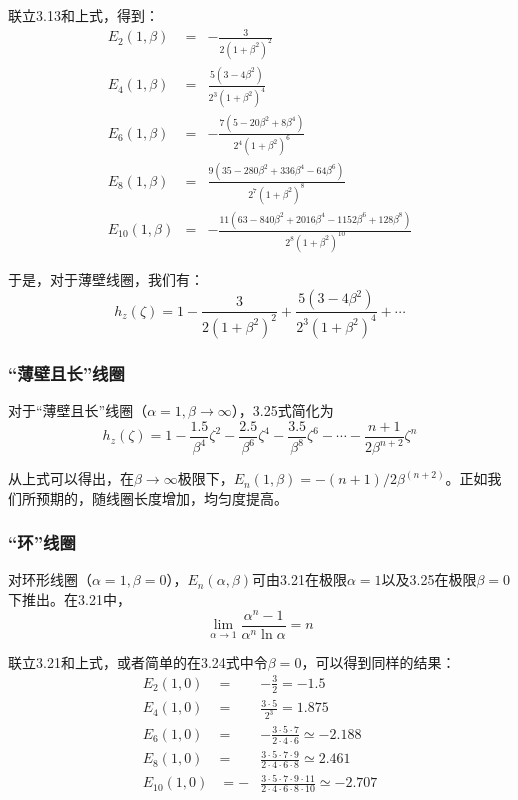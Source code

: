 联立3.13和上式，得到：
\begin{eqnarray}
  E_2(1,\beta) &=& -\frac{3}{2(1+\beta^2)^2} \\ \nonumber
  E_4(1,\beta) &=& \frac{5(3-4\beta^2)}{2^3(1+\beta^2)^4} \\ \nonumber
    E_6(1,\beta) &=& -\frac{7(5-20\beta^2+8\beta^4)}{2^4 (1+\beta^2)^6} \\ \nonumber
      E_8(1,\beta) &=& \frac{9(35-280\beta^2+336\beta^4-64\beta^6)}{2^7(1+\beta^2)^8} \\ \nonumber
        E_{10}(1,\beta) &=& -\frac{11(63-840\beta^2+2016\beta^4-1152\beta^6+128\beta^8)}{2^8(1+\beta^2)^{10}}
\end{eqnarray}

于是，对于薄壁线圈，我们有：
\begin{equation}
  h_z(\zeta)=1-\frac{3}{2(1+\beta^2)^2} +\frac{5(3-4\beta^2)}{2^3(1+\beta^2)^4}+\cdots
\end{equation}

\subsubsection{“薄壁且长”线圈}
对于“薄壁且长”线圈（$\alpha=1,\beta\rightarrow \infty$），3.25式简化为
\begin{equation}
  h_z(\zeta)=1-\frac{1.5}{\beta^4}\zeta^2-\frac{2.5}{\beta^6}\zeta^4-\frac{3.5}{\beta^8}\zeta^6-\cdots-\frac{n+1}{2\beta^{n+2}}\zeta^{n}
\end{equation}

从上式可以得出，在$\beta\rightarrow \infty$极限下，$E_n(1,\beta)=-(n+1)/2\beta^{(n+2)}$。正如我们所预期的，随线圈长度增加，均匀度提高。

\subsubsection{“环”线圈}
对环形线圈（$\alpha=1,\beta=0$），$E_n(\alpha,\beta)$可由3.21在极限$\alpha=1$以及3.25在极限$\beta=0$下推出。在3.21中，
\begin{equation}
  \lim_{\alpha\rightarrow 1}\frac{\alpha^n-1}{\alpha^n \ln\alpha}=n
\end{equation}

联立3.21和上式，或者简单的在3.24式中令$\beta=0$，可以得到同样的结果：
\begin{eqnarray}
  E_2(1,0) &=& -\frac{3}{2}=-1.5 \\ \nonumber
  E_4(1,0) &=& \frac{3\cdot 5}{2^3}=1.875 \\ \nonumber
    E_6(1,0) &=& -\frac{3\cdot 5 \cdot 7}{2\cdot 4\cdot 6}\simeq-2.188 \\ \nonumber
      E_8(1,0) &=&\frac{3\cdot 5 \cdot 7\cdot 9}{2\cdot 4\cdot 6\cdot 8}\simeq 2.461 \\ \nonumber
        E_{10}(1,0) &=-&\frac{3\cdot 5 \cdot 7\cdot 9\cdot 11}{2\cdot 4\cdot 6\cdot 8\cdot 10}\simeq -2.707
\end{eqnarray}

